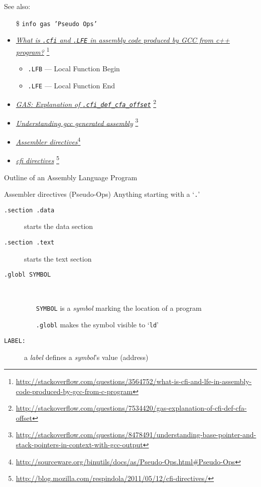 See also:
\begin{itemize}
\item[\$] \texttt{info gas 'Pseudo Ops'}
\item \href{http://stackoverflow.com/questions/3564752/what-is-cfi-and-lfe-in-assembly-code-produced-by-gcc-from-c-program}{\emph{What
      is \texttt{.cfi} and \texttt{.LFE} in assembly code produced by GCC from c++ program?}}
  \footnote{\url{http://stackoverflow.com/questions/3564752/what-is-cfi-and-lfe-in-assembly-code-produced-by-gcc-from-c-program}}
  \begin{itemize}
  \item \texttt{.LFB} --- Local Function Begin
  \item \texttt{.LFE} --- Local Function End
  \end{itemize}
\item \href{http://stackoverflow.com/questions/7534420/gas-explanation-of-cfi-def-cfa-offset}{\emph{GAS: Explanation of \texttt{.cfi\_def\_cfa\_offset}}}
  \footnote{\url{http://stackoverflow.com/questions/7534420/gas-explanation-of-cfi-def-cfa-offset}}
\item \href{http://stackoverflow.com/questions/8478491/understanding-base-pointer-and-stack-pointers-in-context-with-gcc-output}{\emph{Understanding gcc generated assembly}}
  \footnote{\url{http://stackoverflow.com/questions/8478491/understanding-base-pointer-and-stack-pointers-in-context-with-gcc-output}}
\item \href{http://sourceware.org/binutils/docs/as/Pseudo-Ops.html\#Pseudo-Ops}{\emph{Assembler
    directives}}\footnote{\url{http://sourceware.org/binutils/docs/as/Pseudo-Ops.html\#Pseudo-Ops}}
\item \href{http://blog.mozilla.com/respindola/2011/05/12/cfi-directives/}{\emph{cfi directives}}
  \footnote{\url{http://blog.mozilla.com/respindola/2011/05/12/cfi-directives/}}
\end{itemize}

\begin{frame}{Outline of an Assembly Language Program}
  \begin{block}{Assembler directives (Pseudo-Ops)}
    Anything starting with a `\texttt{.}'
    \begin{description}
    \item[\texttt{.section .data}] starts the data section
    \item[\texttt{.section .text}] starts the text section
    \item[\texttt{.globl SYMBOL}] \ 
      \begin{itemize}
      \item[\texttt{SYMBOL}] is a \emph{symbol} marking the location of a program
      \item[\texttt{.globl}] makes the symbol visible to `\texttt{ld}'
      \end{itemize}
    \item[\texttt{LABEL:}] a \emph{label} defines a \emph{symbol}'s value (address)
    \end{description}
  \end{block}
\end{frame}

